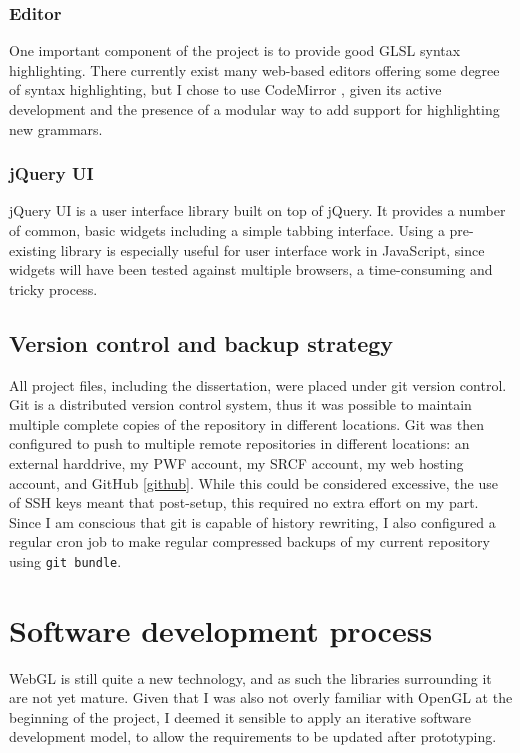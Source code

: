\documentclass[12pt,twoside,notitlepage]{report}
\begin{document}
\subsubsection{Editor}
\label{cmirror}
One important component of the project is to provide good GLSL syntax highlighting. There currently exist many web-based editors offering some degree of syntax highlighting, but I chose to use CodeMirror \cite{codemirror}, given its active development and the presence of a modular way to add support for highlighting new grammars. 

\subsubsection{jQuery UI}
jQuery UI is a user interface library built on top of jQuery. It provides a number of common, basic widgets including a simple tabbing interface. Using a pre-existing library is especially useful for user interface work in JavaScript, since widgets will have been tested against multiple browsers, a time-consuming and tricky process.

\subsection{Version control and backup strategy}
All project files, including the dissertation, were placed under git version control. Git is a distributed version control system, thus it was possible to maintain multiple complete copies of the repository in different locations. Git was then configured to push to multiple remote repositories in different locations: an external harddrive, my PWF account, my SRCF account, my web hosting account, and GitHub \ref{github}. While this could be considered excessive, the use of SSH keys meant that post-setup, this required no extra effort on my part. Since I am conscious that git is capable of history rewriting, I also configured a regular cron job to make regular compressed backups of my current repository using \texttt{git bundle}.

\section{Software development process}
WebGL is still quite a new technology, and as such the libraries surrounding it are not yet mature. Given that I was also not overly familiar with OpenGL at the beginning of the project, I deemed it sensible to apply an iterative software development model, to allow the requirements to be updated after prototyping. 
\end{document}
